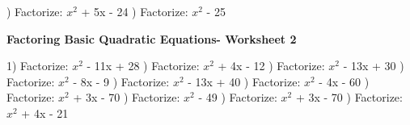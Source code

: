 \documentclass{article}%
\begin{document}
\newline%
\newline%
) Factorize: $x^2$ + 5x - 24%
\newline%
\newline%
) Factorize: $x^2$ - 25%
\newline%
\newline%
\newline%
\pagebreak%
\large%
\begin{center}%
\textbf{Factoring Basic Quadratic Equations- Worksheet 2}%
\newline%
\newline%
\newline%
\end{center} \normalsize%
1) Factorize: $x^2$ - 11x + 28%
\newline%
\newline%
) Factorize: $x^2$ + 4x - 12%
\newline%
\newline%
) Factorize: $x^2$ - 13x + 30%
\newline%
\newline%
) Factorize: $x^2$ - 8x - 9%
\newline%
\newline%
) Factorize: $x^2$ - 13x + 40%
\newline%
\newline%
) Factorize: $x^2$ - 4x - 60%
\newline%
\newline%
) Factorize: $x^2$ + 3x - 70%
\newline%
\newline%
) Factorize: $x^2$ - 49%
\newline%
\newline%
) Factorize: $x^2$ + 3x - 70%
\newline%
\newline%
) Factorize: $x^2$ + 4x - 21%
\newline%
\newline%
\end{document}
